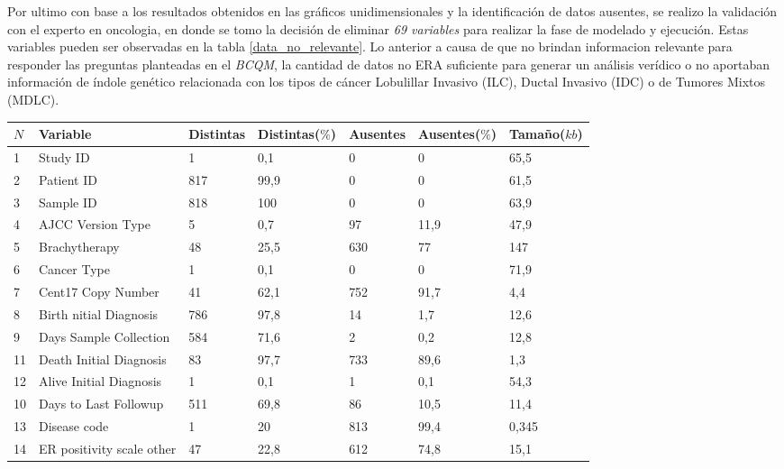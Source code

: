 Por ultimo con base a los resultados obtenidos en las gráficos unidimensionales  y  la identificación de datos ausentes, se realizo la validación con el experto en oncologia, en donde se tomo la decisión de eliminar \textit{69 variables} para realizar la fase de modelado y ejecución. Estas variables pueden ser observadas en la tabla \ref{data_no_relevante}. Lo anterior a causa de que no brindan informacion relevante para responder las preguntas planteadas en el \textit{BCQM}, la cantidad de datos no ERA suficiente para generar un análisis verídico o  no aportaban información de índole genético relacionada con los tipos de cáncer Lobulillar Invasivo (ILC), Ductal Invasivo (IDC) o de Tumores Mixtos (MDLC).

\begin{table}[!htb]
	\footnotesize
	\centering
	\begin{threeparttable}
		\begin{tabular}{p{0.5cm} p{4cm} p{1.5cm} p{2cm} p{1.5cm} p{2cm} p{1.5cm}} \toprule
			$N$  &Variable &Distintas &Distintas($\%$) &Ausentes &Ausentes($\%$)  &Tamaño($kb$)
			\\ \hline	1	&	Study ID	&	1	&	0,1	&	0	&	0	&	65,5
			\\ \hline	2	&	Patient ID	&	817	&	99,9	&	0	&	0	&	61,5
			\\ \hline	3	&	Sample ID	&	818	&	100	&	0	&	0	&	63,9
			\\ \hline	4	&	AJCC Version Type	&	5	&	0,7	&	97	&	11,9	&	47,9
			\\ \hline	5	&	Brachytherapy 	&	48	&	25,5	&	630	&	77	&	147
			\\ \hline	6	&	Cancer Type	&	1	&	0,1	&	0	&	0	&	71,9
			\\ \hline	7	&	Cent17 Copy Number	&	41	&	62,1	&	752	&	91,7	&	4,4
			\\ \hline	8	&	Birth nitial Diagnosis 	&	786	&	97,8	&	14	&	1,7	&	12,6
			\\ \hline	9	&	Days Sample Collection	&	584	&	71,6	&	2	&	0,2	&	12,8
			\\ \hline	11	&	Death Initial Diagnosis 	&	83	&	97,7	&	733	&	89,6	&	1,3
			\\ \hline	12	&	Alive Initial Diagnosis	&	1	&	0,1	&	1	&	0,1	&	54,3
			\\ \hline	10	&	Days to Last Followup	&	511	&	69,8	&	86	&	10,5	&	11,4
			\\ \hline	13	&	Disease code	&	1	&	20	&	813	&	99,4	&	0,345
			\\ \hline	14	&	ER positivity scale other	&	47	&	22,8	&	612	&	74,8	&	15,1

\end{tabular}
\end{threeparttable}
\end{table}
